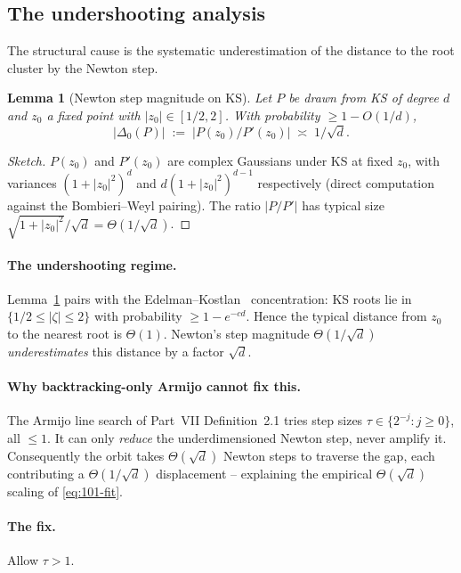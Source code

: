 \documentclass[11pt,a4paper]{article}
\newtheorem{lemma}[theorem]{Lemma}
\begin{document}
\subsection{The undershooting analysis}

The structural cause is the systematic underestimation of the distance to the root cluster by the Newton step.

\begin{lemma}[Newton step magnitude on KS]\label{lem:newton-mag}
Let $P$ be drawn from KS of degree $d$ and $z_0$ a fixed point with $|z_0| \in [1/2, 2]$. With probability $\ge 1 - O(1/d)$,
\begin{equation}\label{eq:Delta-mag}
|\Delta_0(P)| \;:=\; |P(z_0)/P'(z_0)| \;\asymp\; 1/\sqrt d.
\end{equation}
\end{lemma}

\begin{proof}[Sketch]
$P(z_0)$ and $P'(z_0)$ are complex Gaussians under KS at fixed $z_0$, with variances $(1+|z_0|^2)^d$ and $d(1+|z_0|^2)^{d-1}$ respectively (direct computation against the Bombieri--Weyl pairing). The ratio $|P/P'|$ has typical size $\sqrt{1+|z_0|^2}/\sqrt d = \Theta(1/\sqrt d)$.
\end{proof}

\paragraph{The undershooting regime.} Lemma~\ref{lem:newton-mag} pairs with the Edelman--Kostlan~\cite{edelmankostlan} concentration: KS roots lie in $\{1/2 \le |\zeta| \le 2\}$ with probability $\ge 1 - e^{-cd}$. Hence the typical distance from $z_0$ to the nearest root is $\Theta(1)$. Newton's step magnitude $\Theta(1/\sqrt d)$ \emph{underestimates} this distance by a factor $\sqrt d$.

\paragraph{Why backtracking-only Armijo cannot fix this.} The Armijo line search of Part~VII Definition~2.1 tries step sizes $\tau \in \{2^{-j} : j \ge 0\}$, all $\le 1$. It can only \emph{reduce} the underdimensioned Newton step, never amplify it. Consequently the orbit takes $\Theta(\sqrt d)$ Newton steps to traverse the gap, each contributing a $\Theta(1/\sqrt d)$ displacement -- explaining the empirical $\Theta(\sqrt d)$ scaling of \eqref{eq:101-fit}.

\paragraph{The fix.} Allow $\tau > 1$.
\end{document}
